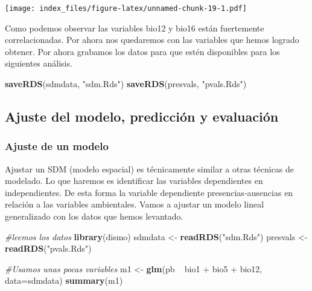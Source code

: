 \documentclass[]{article}
\newenvironment{Shaded}{\begin{snugshade}}{\end{snugshade}}
\newcommand{\KeywordTok}[1]{\textcolor[rgb]{0.13,0.29,0.53}{\textbf{{#1}}}}
\newcommand{\DataTypeTok}[1]{\textcolor[rgb]{0.13,0.29,0.53}{{#1}}}
\newcommand{\StringTok}[1]{\textcolor[rgb]{0.31,0.60,0.02}{{#1}}}
\newcommand{\CommentTok}[1]{\textcolor[rgb]{0.56,0.35,0.01}{\textit{{#1}}}}
\newcommand{\NormalTok}[1]{{#1}}
\begin{document}
\texttt{[image: index\_files/figure-latex/unnamed-chunk-19-1.pdf]}

Como podemos observar las variables bio12 y bio16 están fuertemente
correlacionadas. Por ahora nos quedaremos con las variables que hemos
logrado obtener. Por ahora grabamos los datos para que estén disponibles
para los siguientes análisis.

\begin{Shaded}
\begin{Highlighting}[]
\KeywordTok{saveRDS}\NormalTok{(sdmdata, }\StringTok{"sdm.Rds"}\NormalTok{)}
\KeywordTok{saveRDS}\NormalTok{(presvals, }\StringTok{"pvals.Rds"}\NormalTok{)}
\end{Highlighting}
\end{Shaded}

\subsection{Ajuste del modelo, predicción y
evaluación}\label{ajuste-del-modelo-prediccion-y-evaluacion}

\subsubsection{Ajuste de un modelo}\label{ajuste-de-un-modelo}

Ajustar un SDM (modelo espacial) es técnicamente similar a otras
técnicas de modelado. Lo que haremos es identificar las variables
dependientes en independientes. De esta forma la variable dependiente
presencias-ausencias en relación a las variables ambientales. Vamos a
ajustar un modelo lineal generalizado con los datos que hemos levantado.

\begin{Shaded}
\begin{Highlighting}[]
\CommentTok{#leemos los datos}
\KeywordTok{library}\NormalTok{(dismo)}
\NormalTok{sdmdata <-}\StringTok{ }\KeywordTok{readRDS}\NormalTok{(}\StringTok{"sdm.Rds"}\NormalTok{)}
\NormalTok{presvals <-}\StringTok{ }\KeywordTok{readRDS}\NormalTok{(}\StringTok{"pvals.Rds"}\NormalTok{)}

\CommentTok{#Usamos unas pocas variables}
\NormalTok{m1 <-}\StringTok{ }\KeywordTok{glm}\NormalTok{(pb ~}\StringTok{ }\NormalTok{bio1 +}\StringTok{ }\NormalTok{bio5 +}\StringTok{ }\NormalTok{bio12, }\DataTypeTok{data=}\NormalTok{sdmdata)}
\KeywordTok{summary}\NormalTok{(m1)}
\end{Highlighting}
\end{Shaded}
\end{document}
